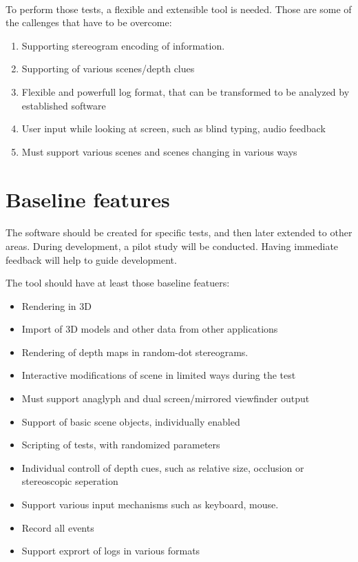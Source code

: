 \documentclass[11pt]{scrartcl}
\begin{document}
\begin{multicols}{2}
\paragraph{}
To perform those tests, a flexible and extensible tool is needed. Those are some of the callenges that have to be overcome:

\begin{enumerate}
\item Supporting stereogram encoding of information.
\item Supporting of various scenes/depth clues
\item Flexible and powerfull log format, that can be transformed to be analyzed by established software
\item User input while looking at screen, such as blind typing, audio feedback
\item Must support various scenes and scenes changing in various ways
\end{enumerate}

\section{Baseline features}
\paragraph{}
The software should be created for specific tests, and then later extended to other areas. During development, a pilot study will be conducted. Having immediate feedback will help to guide development.

The tool should have at least those baseline featuers:

\begin{itemize}
\item Rendering in 3D
\item Import of 3D models and other data from other applications
\item Rendering of depth maps in random-dot stereograms.
\item Interactive modifications of scene in limited ways during the test
\item Must support anaglyph and dual screen/mirrored viewfinder output
\item Support of basic scene objects, individually enabled
\item Scripting of tests, with randomized parameters
\item Individual controll of depth cues, such as relative size, occlusion or stereoscopic seperation
\item Support various input mechanisms such as keyboard, mouse.
\item Record all events
\item Support exprort of logs in various formats
\end{itemize}


\end{multicols}
\end{document}
